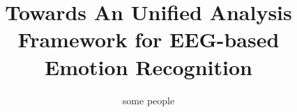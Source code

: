 \documentclass{sig-alternate}
\begin{document}
%

\title{Towards An Unified Analysis Framework for EEG-based Emotion Recognition}


%
\author{
%
%
\alignauthor
some people
}



\maketitle
\begin{abstract}
\vspace{6cm}
\end{abstract}


\end{document}
